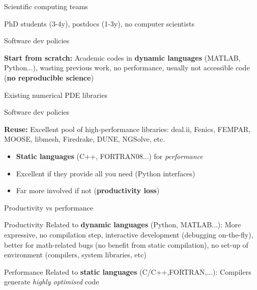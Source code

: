 \begin{frame}{Scientific computing teams}

PhD students (3-4y), postdocs (1-3y), no computer scientists

\vspace{1cm}

\begin{block}{Software dev policies}

  \textbf{Start from scratch:} Academic codes in \textbf{dynamic languages} (MATLAB, Python...), wasting previous work, no performance, usually not accessible code (\textbf{no reproducible science})

\end{block}

\end{frame}

\begin{frame}{Existing numerical PDE libraries}

  \begin{block}{Software dev policies}

    \textbf{Reuse:} Excellent pool of high-performance libraries: deal.ii, Fenics, FEMPAR, MOOSE, libmesh, Firedrake, DUNE, NGSolve, etc.

  \end{block}


  \begin{itemize}

    \item  \textbf{Static languages} (C++, FORTRAN08...) for \emph{performance}

    \item Excellent if they provide all you need (Python interfaces)

    \item  Far more involved if not (\textbf{productivity loss})

  \end{itemize}

\end{frame}

\begin{frame}{Productivity vs performance}

\begin{block}{Productivity}
Related to \textbf{dynamic languages} (Python, MATLAB...): More expressive, no compilation step, interactive development (debugging on-the-fly), better for math-related bugs (no benefit from static compilation), no set-up of environment (compilers, system libraries, etc)
\end{block}

\begin{block}{Performance}
Related to \textbf{static languages} (C/C++,FORTRAN,...): Compilers generate \emph{highly optimised} code
\end{block}

\end{frame}

